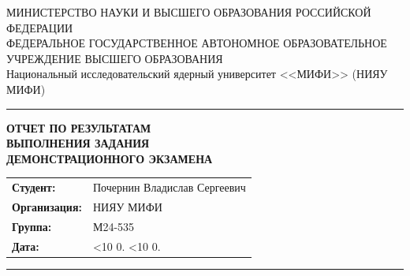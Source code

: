 \documentclass[a4paper, 14pt]{article}
\newcommand{\rusdate}{%
  \ifnum\day<10 0\fi\number\day.%
  \ifnum\month<10 0\fi\number\month.%
  \number\year}
\begin{document}

\begin{titlepage}
\begin{center}
МИНИСТЕРСТВО НАУКИ И ВЫСШЕГО ОБРАЗОВАНИЯ РОССИЙСКОЙ ФЕДЕРАЦИИ\\
ФЕДЕРАЛЬНОЕ ГОСУДАРСТВЕННОЕ АВТОНОМНОЕ ОБРАЗОВАТЕЛЬНОЕ УЧРЕЖДЕНИЕ ВЫСШЕГО ОБРАЗОВАНИЯ\\
Национальный исследовательский ядерный университет <<МИФИ>> (НИЯУ МИФИ)\\
\noindent\rule{500pt}{0.8pt}

\vfill

{\huge \bfseries
ОТЧЕТ ПО РЕЗУЛЬТАТАМ\\[1pt]
ВЫПОЛНЕНИЯ ЗАДАНИЯ\\[7pt]
ДЕМОНСТРАЦИОННОГО ЭКЗАМЕНА
}

\vfill

\large
\renewcommand{\arraystretch}{2}
\begin{tabular}{>{\raggedleft\arraybackslash}p{6cm} p{8.7cm}}
\textbf{Студент:}    & Почернин Владислав Сергеевич \\
\textbf{Организация:}      & НИЯУ МИФИ \\
\textbf{Группа:}           & М24-535 \\
\textbf{Дата:}             & \rusdate \\
\end{tabular}

\vfill

\noindent\rule{500pt}{0.8pt} \\

\vspace{0.3cm}


\end{center}
\end{titlepage}
\end{document}
